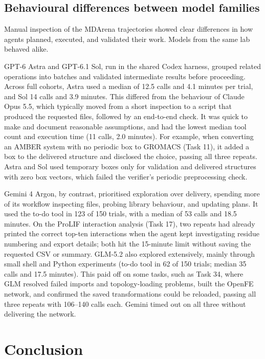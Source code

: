 \subsection{Behavioural differences between model families}

Manual inspection of the MDArena trajectories showed clear differences in how agents planned, executed, and validated their work. Models from the same lab behaved alike. 

GPT-6 Astra and GPT-6.1 Sol, run in the shared Codex harness, grouped related operations into batches and validated intermediate results before proceeding. Across full cohorts, Astra used a median of 12.5 calls and 4.1 minutes per trial, and Sol 14 calls and 3.9 minutes. This differed from the behaviour of Claude Opus 5.5, which typically moved from a short inspection to a script that produced the requested files, followed by an end-to-end check. It was quick to make and document reasonable assumptions, and had the lowest median tool count and execution time (11 calls, 2.0 minutes). For example, when converting an AMBER system with no periodic box to GROMACS (Task 11), it added a box to the delivered structure and disclosed the choice, passing all three repeats. Astra and Sol used temporary boxes only for validation and delivered structures with zero box vectors, which failed the verifier’s periodic preprocessing check. 

Gemini 4 Argon, by contrast, prioritised exploration over delivery, spending more of its workflow inspecting files, probing library behaviour, and updating plans. It used the to-do tool in 123 of 150 trials, with a median of 53 calls and 18.5 minutes. On the ProLIF interaction analysis (Task 17), two repeats had already printed the correct top-ten interactions when the agent kept investigating residue numbering and export details; both hit the 15-minute limit without saving the requested CSV or summary. GLM-5.2 also explored extensively, mainly through small shell and Python experiments (to-do tool in 62 of 150 trials; median 35 calls and 17.5 minutes). This paid off on some tasks, such as Task 34, where GLM resolved failed imports and topology-loading problems, built the OpenFE network, and confirmed the saved transformations could be reloaded, passing all three repeats with 106–140 calls each. Gemini timed out on all three without delivering the network.

\section{Conclusion}


